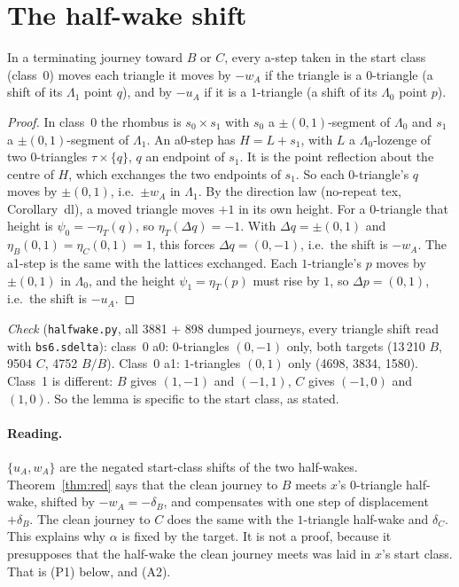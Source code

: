 \documentclass[11pt]{article}
\theoremstyle{definition}\newtheorem{definition}[theorem]{Definition}\newtheorem{remark}[theorem]{Remark}
\begin{document}
\section{The half-wake shift}\label{sec:hw}
\begin{lemma}\label{lem:hw}
In a terminating journey toward $B$ or $C$, every a-step taken in the start class (class~0) moves each triangle it moves by $-w_A$ if the triangle is a $0$-triangle (a shift of its $\Lambda_1$ point $q$), and by $-u_A$ if it is a $1$-triangle (a shift of its $\Lambda_0$ point $p$).
\end{lemma}
\begin{proof}
In class~0 the rhombus is $s_0\times s_1$ with $s_0$ a $\pm(0,1)$-segment of $\Lambda_0$ and $s_1$ a $\pm(0,1)$-segment of $\Lambda_1$.
An a0-step has $H=L+s_1$, with $L$ a $\Lambda_0$-lozenge of two $0$-triangles $\tau\times\{q\}$, $q$ an endpoint of $s_1$. It is the point reflection about the centre of $H$, which exchanges the two endpoints of $s_1$. So each $0$-triangle's $q$ moves by $\pm(0,1)$, i.e.\ $\pm w_A$ in $\Lambda_1$.
By the direction law (no-repeat tex, Corollary~dl), a moved triangle moves $+1$ in its own height. For a $0$-triangle that height is $\psi_0=-\eta_T(q)$, so $\eta_T(\Delta q)=-1$. With $\Delta q=\pm(0,1)$ and $\eta_B(0,1)=\eta_C(0,1)=1$, this forces $\Delta q=(0,-1)$, i.e.\ the shift is $-w_A$.
The a1-step is the same with the lattices exchanged. Each $1$-triangle's $p$ moves by $\pm(0,1)$ in $\Lambda_0$, and the height $\psi_1=\eta_T(p)$ must rise by $1$, so $\Delta p=(0,1)$, i.e.\ the shift is $-u_A$.
\end{proof}
\noindent\emph{Check} (\texttt{halfwake.py}, all 3881 + 898 dumped journeys, every triangle shift read with \texttt{bs6.sdelta}): class~0 a0: $0$-triangles $(0,-1)$ only, both targets (13\,210 $B$, 9504 $C$, 4752 $B/B$). Class~0 a1: $1$-triangles $(0,1)$ only (4698, 3834, 1580). Class~1 is different: $B$ gives $(1,-1)$ and $(-1,1)$, $C$ gives $(-1,0)$ and $(1,0)$. So the lemma is specific to the start class, as stated.
\paragraph{Reading.} $\{u_A,w_A\}$ are the negated start-class shifts of the two half-wakes. Theorem~\ref{thm:red} says that the clean journey to $B$ meets $x$'s $0$-triangle half-wake, shifted by $-w_A=-\delta_B$, and compensates with one step of displacement $+\delta_B$. The clean journey to $C$ does the same with the $1$-triangle half-wake and $\delta_C$. This explains why $\alpha$ is fixed by the target. It is not a proof, because it presupposes that the half-wake the clean journey meets was laid in $x$'s start class. That is (P1) below, and (A2).
\end{document}
